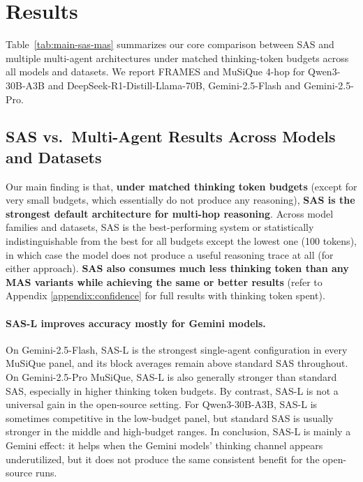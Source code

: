 \documentclass{article} %
\begin{document}
\section{Results}
\label{sec:results}

Table~\ref{tab:main-sas-mas} summarizes our core comparison between SAS and multiple multi-agent architectures under matched thinking-token budgets across all models and datasets.
We report FRAMES and MuSiQue 4-hop for Qwen3-30B-A3B and DeepSeek-R1-Distill-Llama-70B, Gemini-2.5-Flash and Gemini-2.5-Pro.
\subsection{SAS vs.\ Multi-Agent Results Across Models and Datasets}
\label{subsec:main-main-results}

Our main finding is that, \textbf{under matched thinking token budgets} (except for very small budgets, which essentially do not produce any reasoning), \textbf{SAS is the strongest default architecture for multi-hop reasoning}. 
Across model families and datasets, SAS is the best-performing system or statistically indistinguishable from the best for all budgets except the lowest one (100 tokens), in which case the model does not produce a useful reasoning trace at all (for either approach). \textbf{SAS also consumes much less thinking token than any MAS variants while achieving the same or better results} (refer to Appendix \ref{appendix:confidence} for full results with thinking token spent).

\paragraph{SAS-L improves accuracy mostly for Gemini models.}
On Gemini-2.5-Flash, SAS-L is the strongest single-agent configuration in every MuSiQue panel, and its block averages remain above standard SAS throughout.
On Gemini-2.5-Pro MuSiQue, SAS-L is also generally stronger than standard SAS, especially in higher thinking token budgets.
By contrast, SAS-L is not a universal gain in the open-source setting.
For Qwen3-30B-A3B, SAS-L is sometimes competitive in the low-budget panel, but standard SAS is usually stronger in the middle and high-budget ranges.
In conclusion, SAS-L is mainly a Gemini effect: it helps when the Gemini models' thinking channel appears underutilized, but it does not produce the same consistent benefit for the open-source runs.
\end{document}
